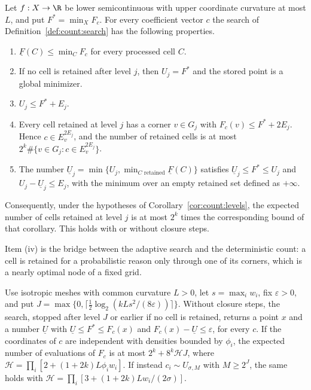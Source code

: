 \begin{theorem}\label{thm:count:cells}
Let $f:X\to\R$ be lower semicontinuous with upper coordinate curvature at
most $L$, and put $F^*=\min_XF_c$. For every coefficient vector $c$ the
search of Definition~\ref{def:count:search} has the following properties.
\begin{enumerate}[label=(\roman*)]
\item $\underline F(C)\le\min_CF_c$ for every processed cell $C$.
\item If no cell is retained after level $j$, then $U_j=F^*$ and the stored
 point is a global minimizer.
\item $U_j\le F^*+E_j$.
\item Every cell retained at level $j$ has a corner $v\in G_j$ with
 $F_c(v)\le F^*+2E_j$. Hence $c\in E_v^{2E_j}$, and the number of retained
 cells is at most $2^k\#\{v\in G_j:c\in E_v^{2E_j}\}$.
\item The number $\underline U_j=\min\{U_j,\min_{C\text{ retained}}\underline F(C)\}$
 satisfies $\underline U_j\le F^*\le U_j$ and $U_j-\underline U_j\le E_j$,
 with the minimum over an empty retained set defined as $+\infty$.
\end{enumerate}
Consequently, under the hypotheses of Corollary~\ref{cor:count:levels}, the
expected number of cells retained at level $j$ is at most $2^k$ times the
corresponding bound of that corollary. This holds with or without closure
steps.
\end{theorem}

Item (iv) is the bridge between the adaptive search and the deterministic
count: a cell is retained for a probabilistic reason only through one of its
corners, which is a nearly optimal node of a fixed grid.

\begin{corollary}\label{cor:count:approx}
Use isotropic meshes with common curvature $L>0$, let $s=\max_iw_i$, fix
$\varepsilon>0$, and put
$J=\max\{0,\lceil\frac12\log_2(kLs^2/(8\varepsilon))\rceil\}$. Without
closure steps, the search, stopped after level $J$ or earlier if no cell is
retained, returns a point $x$ and a number $\underline U$ with
$\underline U\le F^*\le F_c(x)$ and $F_c(x)-\underline U\le\varepsilon$, for
every $c$. If the coordinates of $c$ are independent with densities bounded
by $\phi_i$, the expected number of evaluations of $F_c$ is at most
$2^k+8^k\mathcal HJ$, where $\mathcal H=\prod_i[2+(1+2k)L\phi_iw_i]$. If
instead $c_i\sim U_{\sigma,M}$ with $M\ge2^J$, the same holds with
$\mathcal H=\prod_i[3+(1+2k)Lw_i/(2\sigma)]$.
\end{corollary}

